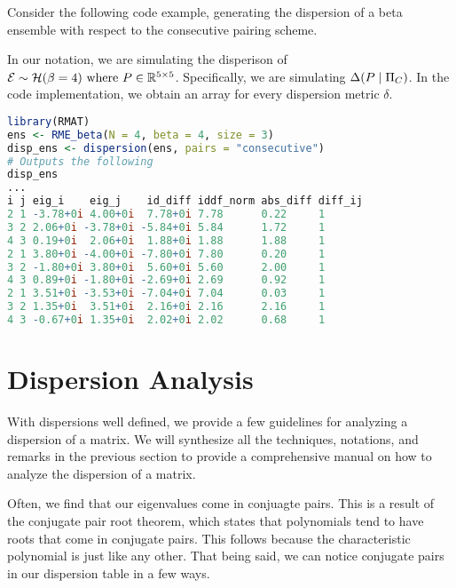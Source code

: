 Consider the following code example, generating the dispersion of a beta ensemble with respect to the consecutive pairing scheme.

\begin{code}
In our notation, we are simulating the disperison of $\mathcal{E} \sim \mathcal{H}(\beta = 4) \text{ where } P \in \mathbb{R}^{5 \times 5}$. Specifically, we are simulating $\Delta(P \mid \Pi_C)$. In the code implementation, we obtain an array for every dispersion metric $\delta$.
\end{code}
\begin{lstlisting}[language=R]
library(RMAT)
ens <- RME_beta(N = 4, beta = 4, size = 3)
disp_ens <- dispersion(ens, pairs = "consecutive")
# Outputs the following
disp_ens
...
i j eig_i    eig_j    id_diff iddf_norm abs_diff diff_ij
2 1 -3.78+0i 4.00+0i  7.78+0i 7.78      0.22     1
3 2 2.06+0i -3.78+0i -5.84+0i 5.84      1.72     1
4 3 0.19+0i  2.06+0i  1.88+0i 1.88      1.88     1
2 1 3.80+0i -4.00+0i -7.80+0i 7.80      0.20     1
3 2 -1.80+0i 3.80+0i  5.60+0i 5.60      2.00     1
4 3 0.89+0i -1.80+0i -2.69+0i 2.69      0.92     1
2 1 3.51+0i -3.53+0i -7.04+0i 7.04      0.03     1
3 2 1.35+0i  3.51+0i  2.16+0i 2.16      2.16     1
4 3 -0.67+0i 1.35+0i  2.02+0i 2.02      0.68     1
\end{lstlisting}


\section{Dispersion Analysis}

With dispersions well defined, we provide a few guidelines for analyzing a dispersion of a matrix. We will synthesize all the techniques, notations, and remarks in the previous section to provide a comprehensive manual on how to analyze the dispersion of a matrix.


Often, we find that our eigenvalues come in conjuagte pairs. This is a result of the conjugate pair root theorem, which states that polynomials tend to have roots that come in conjugate pairs. This follows because the characteristic polynomial is just like any other. That being said, we can notice conjugate pairs in our dispersion table in a few ways.

